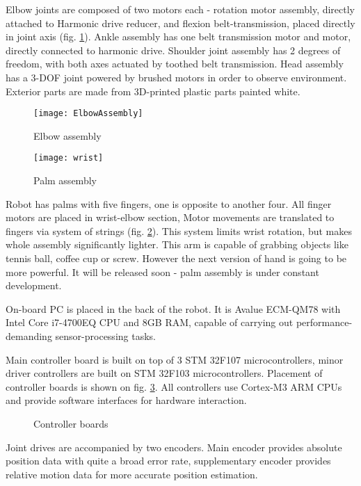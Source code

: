 \documentclass[letterpaper, 10 pt, conference]{ieeeconf}  %
\begin{document}
Elbow joints are composed of two motors each - rotation motor assembly, directly
attached to Harmonic drive reducer, and flexion belt-transmission, placed
directly in joint axis (fig. \ref{img:joints}).
Ankle assembly has one belt transmission motor and motor, directly connected
to harmonic drive.
Shoulder joint assembly has 2 degrees of freedom, with both axes actuated by
toothed belt transmission.
Head assembly has a 3-DOF joint powered by brushed
motors in order to observe environment.
Exterior parts are made from 3D-printed plastic parts painted white.

\begin{figure}[thpb]
\centering

\texttt{[image: ElbowAssembly]}
\caption{Elbow assembly}
\label{img:joints}
\end{figure}

\begin{figure}[thpb]
\centering

\texttt{[image: wrist]}
\caption{Palm assembly}
\label{img:wrist}
\end{figure} 

Robot has palms with five fingers, one is opposite to another four. All
finger motors are placed in wrist-elbow section, Motor movements are
translated to fingers via system of strings (fig. \ref{img:wrist}). This system
limits wrist rotation, but makes whole assembly significantly lighter. This arm
is capable of grabbing objects like tennis ball, coffee cup or screw. However the next
version of hand is going to be more powerful. It will be released soon - palm
assembly is under constant development.

On-board PC is placed in the back of the robot. It is Avalue ECM-QM78 with Intel
Core i7-4700EQ CPU and 8GB RAM, capable of carrying out performance-demanding
sensor-processing tasks. 

Main controller board is built on top of 3 STM 32F107 microcontrollers, minor
driver controllers are built on STM 32F103 microcontrollers. Placement of
controller boards is shown on fig. \ref{img:electronics}.  All controllers use
Cortex-M3 ARM CPUs and provide software interfaces for hardware interaction.

\begin{figure}[thpb]
\centering
{}
\caption{Controller boards}
\label{img:electronics}
\end{figure}

Joint drives are accompanied by two encoders. Main encoder provides absolute
position data with quite a broad error rate, supplementary encoder provides
relative motion data for more accurate position estimation.
 
\end{document}
